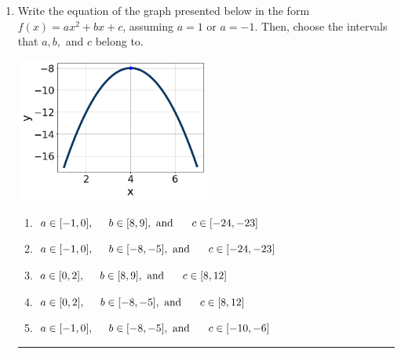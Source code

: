 \documentclass[14pt]{extbook}
\newcommand{\litem}[1]{\item#1\hspace*{-1cm}\rule{\textwidth}{0.4pt}}
\begin{document}
\begin{enumerate}
{\begin{enumerate}[label=\Alph*.]
\end{enumerate} }
\litem{
Write the equation of the graph presented below in the form $f(x)=ax^2+bx+c$, assuming  $a=1$ or $a=-1$. Then, choose the intervals that $a, b,$ and $c$ belong to.
\begin{center}
    \includegraphics[width=0.5\textwidth]{../Figures/quadraticGraphToEquationB.png}
\end{center}
\begin{enumerate}[label=\Alph*.]
\item \( a \in [-1, 0], \hspace*{5mm} b \in [8, 9], \text{ and } \hspace*{5mm} c \in [-24, -23] \)
\item \( a \in [-1, 0], \hspace*{5mm} b \in [-8, -5], \text{ and } \hspace*{5mm} c \in [-24, -23] \)
\item \( a \in [0, 2], \hspace*{5mm} b \in [8, 9], \text{ and } \hspace*{5mm} c \in [8, 12] \)
\item \( a \in [0, 2], \hspace*{5mm} b \in [-8, -5], \text{ and } \hspace*{5mm} c \in [8, 12] \)
\item \( a \in [-1, 0], \hspace*{5mm} b \in [-8, -5], \text{ and } \hspace*{5mm} c \in [-10, -6] \)


\end{enumerate}}
\end{enumerate}
\end{document}
